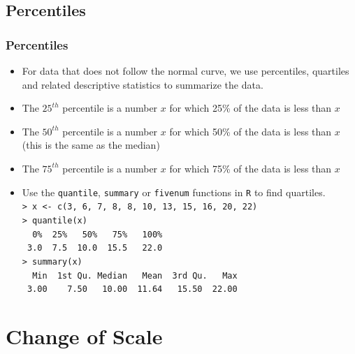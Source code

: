 \documentclass[t]{beamer}
\begin{document}
\subsection{Percentiles}
\begin{frame}[t]\frametitle{Percentiles}
{\small
\begin{itemize}
\item For data that does not follow the normal curve, we use percentiles, quartiles
  and related descriptive statistics to summarize the data.
\item The $25^{th}$ percentile is a number $x$ for which 25\% of the data is 
  less than $x$
\item The $50^{th}$ percentile is a number $x$ for which 50\% of the data is 
  less than $x$ (this is the same as the median)
\item The $75^{th}$ percentile is a number $x$ for which 75\% of the data is 
  less than $x$
\item Use the \texttt{quantile}, \texttt{summary} or \texttt{fivenum} functions in \texttt{R}
  to find quartiles.\\
\texttt{> x <- c(3, 6, 7, 8, 8, 10, 13, 15, 16, 20, 22)}\\
\texttt{> quantile(x)}\\[3pt]
\texttt{{\ }  0\%\ \   25\%\  \ \ 50\%\ \ \   75\%\ \ \   100\%}\\
\texttt{ 3.0\  \  7.5\  \  10.0\ \   15.5\ \  \ 22.0}\\[3pt]
\texttt{> summary(x)}\\
\texttt{{\ } Min\ \ 1st Qu.\ Median\ \ \ Mean\ \ 3rd Qu.\ \ \ Max}\\
\texttt{\ 3.00\ \ \ \ 7.50\ \ \ 10.00\ \  11.64\ \ \ 15.50\ \ 22.00}
\end{itemize}
}

\end{frame}

%


\section[Change of Scale]{Change of Scale}
\end{document}
